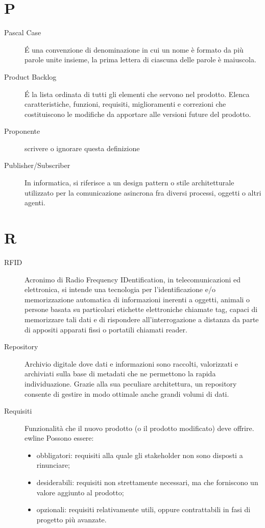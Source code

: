 \documentclass[a4paper, oneside]{article}
\begin{document}
\section{P}
\begin{description}
  \item[Pascal Case] É una convenzione di denominazione in cui un nome è formato da più parole unite insieme, la prima lettera di ciascuna delle parole è maiuscola.
  \item[Product Backlog] É la lista ordinata di tutti gli elementi che servono nel prodotto. Elenca caratteristiche, funzioni, requisiti, miglioramenti e correzioni che costituiscono le modifiche da apportare alle versioni future del prodotto.
  \item[Proponente] {scrivere o ignorare questa definizione}
  \item[Publisher/Subscriber] In informatica, si riferisce a un design pattern o stile architetturale utilizzato per la comunicazione asincrona fra diversi processi, oggetti o altri agenti.
\end{description}
\newpage
\section{R}
\begin{description}
  \item[RFID] Acronimo di Radio Frequency IDentification, in telecomunicazioni ed elettronica, si intende una tecnologia per l'identificazione e/o memorizzazione automatica di informazioni inerenti a oggetti, animali o persone basata su particolari etichette elettroniche chiamate tag, capaci di memorizzare tali dati e di rispondere all'interrogazione a distanza da parte di appositi apparati fissi o portatili chiamati reader.
  \item[Repository] Archivio digitale dove dati e informazioni sono raccolti, valorizzati e archiviati sulla base di metadati che ne permettono la rapida individuazione. Grazie alla sua peculiare architettura, un repository consente di gestire in modo ottimale anche grandi volumi di dati.
  \item[Requisiti] Funzionalità che il nuovo prodotto (o il prodotto modificato) deve offrire. 
ewline Possono essere: \begin{itemize} \item obbligatori: requisiti alla quale gli stakeholder non sono disposti a rinunciare; \item desiderabili: requisiti non strettamente necessari, ma che forniscono un valore aggiunto al prodotto; \item opzionali: requisiti relativamente utili, oppure contrattabili in fasi di progetto più avanzate. \end{itemize}
\end{description}
\newpage
\end{document}
